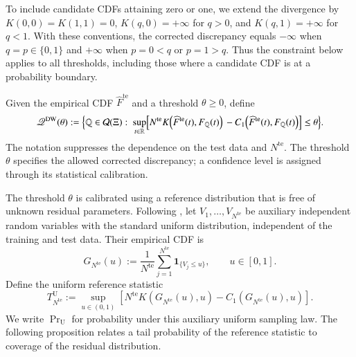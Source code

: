 \documentclass[review,11pt,3p,authoryear,nopreprintline]{elsarticle}
\begin{document}
To include candidate CDFs attaining zero or one, we extend the divergence by $K(0,0)=K(1,1)=0$, $K(q,0)=+\infty$ for $q>0$, and $K(q,1)=+\infty$ for $q<1$. With these conventions, the corrected discrepancy equals $-\infty$ when $q=p\in\{0,1\}$ and $+\infty$ when $p=0<q$ or $p=1>q$. Thus the constraint below applies to all thresholds, including those where a candidate CDF is at a probability boundary.

\begin{definition}
  \label{definition-dw-ambiguity-set}
  Given the empirical CDF $\widehat F^{\mathrm{te}}$ and a threshold $\theta\ge0$, define
  \begin{equation} 
      \mathscr Q^{\mathrm{DW}}(\theta):=\Bigl\{\mathbb Q\in\mathcal Q(\Xi):\ 
      \sup_{t\in\mathbb R}\Bigl[ N^{\mathrm{te}}K\!\left(\widehat F^{\mathrm{te}}(t),F_{\mathbb Q}(t)\right) 
       {}-C_1\!\left(\widehat F^{\mathrm{te}}(t),F_{\mathbb Q}(t)\right)\Bigr]\le\theta\Bigr\}. 
    \label{eq-cdf-ambiguity-set}
  \end{equation}
  The notation suppresses the dependence on the test data and $N^{\mathrm{te}}$. The threshold $\theta$ specifies the allowed corrected discrepancy; a confidence level is assigned through its statistical calibration.
\end{definition}

The threshold $\theta$ is calibrated using a reference distribution that is free of unknown residual parameters. Following \citet[Section~3.1]{L.J23}, let $V_1,\ldots,V_{N^{\mathrm{te}}}$ be auxiliary independent random variables with the standard uniform distribution, independent of the training and test data. Their empirical CDF is
\begin{equation}
  G_{N^{\mathrm{te}}}(u):=\frac{1}{N^{\mathrm{te}}}\sum_{j=1}^{N^{\mathrm{te}}}\mathbf 1_{\{V_j\le u\}},\qquad u\in[0,1].
  \label{eq-dw-reference-cdf}
\end{equation}
Define the uniform reference statistic
\begin{equation}
  T_{N^{\mathrm{te}}}^{\mathrm U}:=\sup_{u\in(0,1)}\left[N^{\mathrm{te}}K\!\left(G_{N^{\mathrm{te}}}(u),u\right)-C_1\!\left(G_{N^{\mathrm{te}}}(u),u\right)\right].
  \label{eq-dw-reference-statistic}
\end{equation}
We write $\Pr_{\mathrm U}$ for probability under this auxiliary uniform sampling law. The following proposition relates a tail probability of the reference statistic to coverage of the residual distribution.
\end{document}
